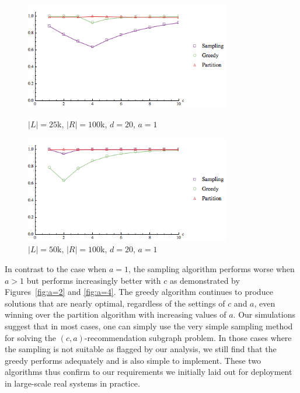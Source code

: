 \begin{figure}[t]
\centering
\begin{minipage}[h]{0.48\textwidth}
\centering
\includegraphics[width=0.8\textwidth]{images/l=25000,r=100000_Greedy_vs_Naive.png}
\caption{$|L|=25$k, $|R|=100$k, $d=20$, $a=1$}\label{fig:a=1:1}
\end{minipage}
\hspace{0cm}
\begin{minipage}[h]{0.48\textwidth}
\centering
\includegraphics[width=0.8\textwidth]{images/l=50000,r=100000_Greedy_vs_Naive.png}
\caption{$|L|=50$k, $|R|=100$k, $d=20$, $a=1$}\label{fig:a=1:2}
\end{minipage}
\vspace{-0.2in}
\end{figure}


\vs In contrast to the case when $a=1$, the sampling algorithm
performs worse when $a>1$ but performs increasingly better with $c$ as
demonstrated by Figures~\ref{fig:a=2} and \ref{fig:a=4}. The greedy
algorithm continues to produce solutions that are nearly optimal,
regardless of the settings of $c$ and $a$, even winning over the
partition algorithm with increasing values of $a$. Our simulations
suggest that in most cases, one can simply use the very simple
sampling method for solving the $(c, a)$-recommendation subgraph
problem. In those cases where the sampling is not suitable as flagged
by our analysis, we still find that the greedy performs adequately and
is also simple to implement. These two algorithms thus confirm to our
requirements we initially laid out for deployment in large-scale real
systems in practice.



